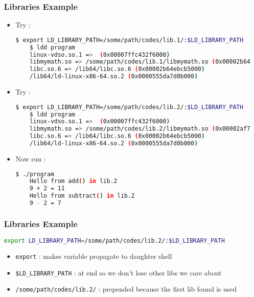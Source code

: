 \documentclass{beamer}
\newcommand{\code}[1]{\colorbox{codegray}{\texttt{#1}}}
\begin{document}
\begin{frame}[fragile]
\frametitle{Libraries Example}
\begin{itemize}
    \item Try : 
    \begingroup
    \tiny
    \begin{lstlisting}[backgroundcolor = \color{codegray}, language = Bash, showstringspaces=false]
    $ export LD_LIBRARY_PATH=/some/path/codes/lib.1/:$LD_LIBRARY_PATH
    $ ldd program
	linux-vdso.so.1 =>  (0x00007ffc432f6000)
	libmymath.so => /some/path/codes/lib.1/libmymath.so (0x00002b64eba91000)
	libc.so.6 => /lib64/libc.so.6 (0x00002b64ebcb5000)
	/lib64/ld-linux-x86-64.so.2 (0x0000555da7d0b000)
    \end{lstlisting}
    \endgroup

    \pause
    \item Try : 
    \begingroup
    \tiny
    \begin{lstlisting}[backgroundcolor = \color{codegray}, language = Bash, showstringspaces=false]
    $ export LD_LIBRARY_PATH=/some/path/codes/lib.2/:$LD_LIBRARY_PATH
    $ ldd program
	linux-vdso.so.1 =>  (0x00007ffc432f6000)
	libmymath.so => /some/path/codes/lib.2/libmymath.so (0x00002af711fe1000)
	libc.so.6 => /lib64/libc.so.6 (0x00002b64ebcb5000)
	/lib64/ld-linux-x86-64.so.2 (0x0000555da7d0b000)
    \end{lstlisting}
    \endgroup

    \pause
    \item Now run : 
    \begingroup
    \tiny
    \begin{lstlisting}[backgroundcolor = \color{codegray}, language = Bash, showstringspaces=false]
    $ ./program
    Hello from add() in lib.2
    9 + 2 = 11
    Hello from subtract() in lib.2
    9 - 2 = 7
    \end{lstlisting}
    \endgroup
\end{itemize}
\end{frame}


\begin{frame}[fragile]
\frametitle{Libraries Example}
    \begingroup
    \scriptsize
    \begin{lstlisting}[backgroundcolor = \color{codegray}, language = Bash, showstringspaces=false]
    export LD_LIBRARY_PATH=/some/path/codes/lib.2/:$LD_LIBRARY_PATH
    \end{lstlisting}
    \endgroup

    \begin{itemize}
        \item \code{\scriptsize export} : makes variable propagate to daughter shell
        \pause
        \bigskip
        \item \code{\scriptsize \$LD\_LIBRARY\_PATH} : at end so we don't lose other libs we care about
        \pause
        \bigskip
        \item \code{\scriptsize /some/path/codes/lib.2/} : prepended because the first lib found is used
    \end{itemize}
\end{frame}
\end{document}
